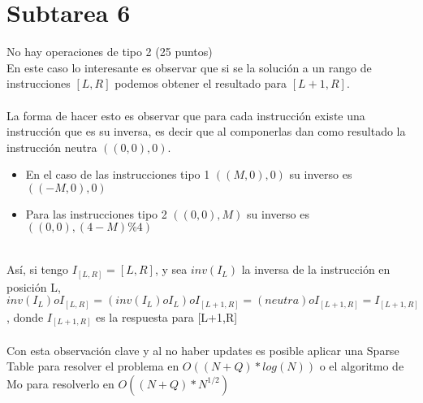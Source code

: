 \documentclass{article}
\begin{document}
\section{Subtarea 6}
No hay operaciones de tipo 2 (25 puntos)
\\En este caso lo interesante es observar que si se la solución a un rango de instrucciones $[L,R]$ podemos obtener el resultado para $[L+1,R]$.
\\\\ La forma de hacer esto es observar que para cada instrucción existe una instrucción que es su inversa, es decir que al componerlas dan como resultado la instrucción neutra $((0,0),0)$.
\begin{itemize}
    \item En el caso de las instrucciones tipo 1 $((M,0),0)$ su inverso es $((-M,0),0)$
    \item Para las instrucciones tipo 2 $((0,0),M)$ su inverso es $((0,0),(4-M)\%4)$
\end{itemize}
\\ Así, si tengo $I_{[L,R]} = [L,R]$, y sea $inv(I_L)$ la inversa de la instrucción en posición L, $inv(I_L) o I_{[L,R]} = (inv(I_L) o I_L) o I_{[L+1,R]} = (neutra) o I_{[L+1,R]} = I_{[L+1,R]}$, donde $I_{[L+1,R]}$ es la respuesta para [L+1,R]
\\\\ Con esta observación clave y al no haber updates es posible aplicar una Sparse Table para resolver el problema en $O((N+Q)*log(N))$ o el algoritmo de Mo para resolverlo en $O((N+Q)*N^{1/2})$
\end{document}
